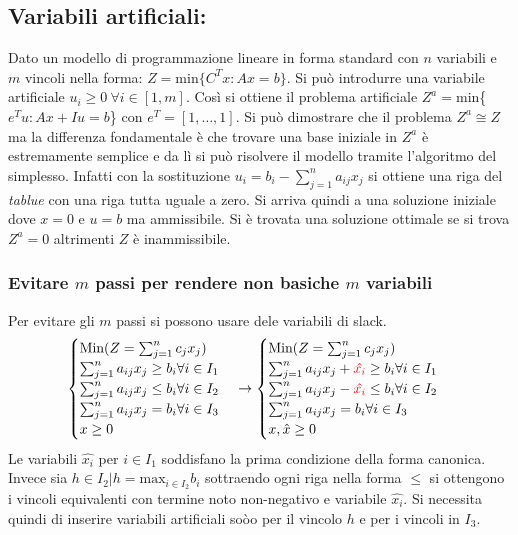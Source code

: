 \documentclass{article}
\begin{document}
\subsection{Variabili artificiali:}
Dato un modello di programmazione lineare in forma standard con $n$ variabili e $m$ vincoli nella forma: $Z=$min$\{C^Tx:Ax=b\}$. Si può introdurre una variabile artificiale $u_i\ge0\ \forall i \in [1,m]$. Così si ottiene il problema artificiale $Z^a=$min\{$e^Tu:Ax+Iu=b$\} con $e^T=[1,\dots,1]$. Si può dimostrare che il problema $Z^a\cong Z$ ma la differenza fondamentale è che trovare una base iniziale in $Z^a$ è estremamente semplice e da lì si può risolvere il modello tramite l'algoritmo del simplesso. Infatti con la sostituzione $u_i=b_i-\sum_{j=1}^{n}a_{ij}x_j$ si ottiene una riga del \textit{tablue} con una riga tutta uguale a zero. Si arriva quindi a una soluzione iniziale dove $x=0$ e $u=b$ ma ammissibile. Si è trovata una soluzione ottimale se si trova $Z^a=0$ altrimenti $Z$ è inammissibile.
\subsubsection{Evitare $m$ passi per rendere non basiche $m$ variabili}
Per evitare gli $m$ passi si possono usare dele variabili di slack.
$$
  \begin{cases}
    \text{Min} (Z=\sum_{j=1}^{n}c_jx_j)              \\
    \sum_{j=1}^{n}a_{ij}x_j\ge b_i \forall i \in I_1 \\
    \sum_{j=1}^{n}a_{ij}x_j\le b_i \forall i \in I_2 \\
    \sum_{j=1}^{n}a_{ij}x_j = b_i \forall i \in I_3  \\
    x\ge 0
  \end{cases}
  \to
  \begin{cases}
    \text{Min} (Z=\sum_{j=1}^{n}c_jx_j)                                         \\
    \sum_{j=1}^{n}a_{ij}x_j+\textcolor{red}{\hat{x_i}}\ge b_i \forall i \in I_1 \\
    \sum_{j=1}^{n}a_{ij}x_j-\textcolor{red}{\hat{x_i}}\le b_i \forall i \in I_2 \\
    \sum_{j=1}^{n}a_{ij}x_j = b_i \forall i \in I_3                             \\
    x, \hat{x} \ge 0
  \end{cases}
$$
Le variabili $\hat{x_i}$ per $i \in I_1$ soddisfano la prima condizione della forma canonica. Invece sia $h\in I_2|h=\text{max}_{i\in I_2} {b_i}$ sottraendo ogni riga nella forma $\le$ si ottengono i vincoli equivalenti con termine noto non-negativo e variabile $\hat{x_i}$. Si necessita quindi di inserire variabili artificiali soòo per il vincolo $h$ e per i vincoli in $I_3$.
\end{document}
